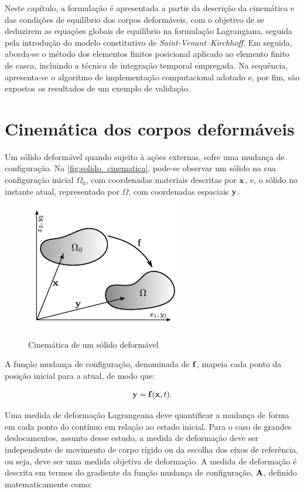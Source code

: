 Neste capítulo, a formulação é apresentada a partir da descrição da cinemática e das condições de equilíbrio dos corpos deformáveis, com o objetivo de se deduzirem as equações globais de equilíbrio na formulação Lagrangiana, seguida pela introdução do modelo constitutivo de \textit{Saint-Venant–Kirchhoff}. Em seguida, aborda-se o método dos elementos finitos posicional aplicado ao elemento finito de casca, incluindo a técnica de integração temporal empregada. Na sequência, apresenta-se o algoritmo de implementação computacional adotado e, por fim, são expostos os resultados de um exemplo de validação.

\section{Cinemática dos corpos deformáveis}

Um sólido deformável quando sujeito à ações externas, sofre uma mudança de configuração. Na \autoref{fig:solido_cinematica}, pode-se observar um sólido na sua configuração inicial $\Omega_{0}$, com coordenadas materiais descritas por $\mathbf{x}$, e, o sólido no instante atual, representado por $\Omega$, com coordenadas espaciais $\mathbf{y}$. 

\begin{figure}[!htbp]
	\caption{Cinemática de um sólido deformável}
	\centering
	\includegraphics[scale=1.7]{Imagens/Cap4/sol_cinematica.pdf}	
	\label{fig:solido_cinematica}
\end{figure}

A função mudança de configuração, denominada de $\mathbf{f}$, mapeia cada ponto da posição inicial para a atual, de modo que:

\begin{align}
	\mathbf{y} = \mathbf{f}(\mathbf{x},t).
\end{align}

Uma medida de deformação Lagrangeana deve quantificar a mudança de forma em cada ponto do contínuo em relação ao estado inicial. Para o caso de grandes deslocamentos, assunto desse estudo, a medida de deformação deve ser independente de movimento de corpo rígido ou da escolha dos eixos de referência, ou seja, deve ser uma medida objetiva de deformação. A medida de deformação é descrita em termos do gradiente da função mudança de configuração, $\mathbf{A}$, definido matematicamente como:

